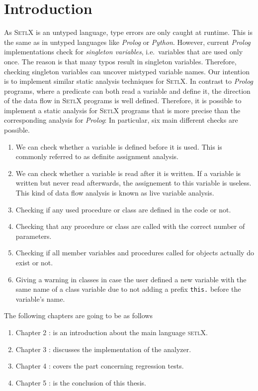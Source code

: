 \documentclass[11pt]{report}
\begin{document}
\tableofcontents

\chapter{Introduction}
As \textsc{SetlX} is an untyped language, type errors are only caught at runtime.  This is the same
as in untyped languages like \textsl{Prolog} or \textsl{Python}.  However, current \textsl{Prolog}
implementations check for \emph{singleton variables}, i.e.~variables that are used only once.  The
reason is that many typos result in singleton variables.  Therefore, checking singleton variables
can uncover mistyped variable names.  Our intention 
is to implement similar static analysis techniques for \textsc{SetlX}.  In contrast to
\textsl{Prolog} programs, where a predicate can both read a variable and define it, the direction of
the data flow in \textsc{SetlX} programs is well defined.  Therefore, it is possible to implement a
static analysis for \textsc{SetlX} programs that is more precise than the corresponding analysis for
\textsl{Prolog}:  In particular, six main different checks are possible.

\begin{enumerate}
\item We can check whether a variable is defined before it is used.
      This is commonly referred to as definite assignment analysis.
\item We can check whether a variable is read after it is written.  If a variable is written but
      never read afterwards, the assignement to this variable is useless.  This kind of data flow
      analysis is known as live variable analysis.
\item Checking if any used procedure or class are defined in the code or not.
\item Checking that any procedure or class are called with the correct number of parameters.
\item Checking if all member variables and procedures called for objects actually do exist or not.
\item Giving a warning in classes in case the user defined a new variable with the same name of a class variable due to not adding a prefix \texttt{this.} before the variable's name.
\end{enumerate}

The following chapters are going to be as follows
\begin{enumerate}
\item Chapter 2 : is an introduction about the main language \textsc{setlX}.
\item Chapter 3 : discusses the implementation of the analyzer.
\item Chapter 4 : covers the part concerning regression tests.
\item Chapter 5 : is the conclusion of this thesis.
\end{enumerate}
\end{document}
